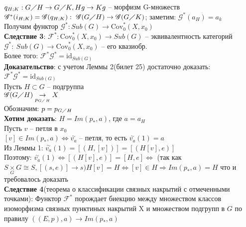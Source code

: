 	$q_{H;K}: G\diagup H \rightarrow G\diagup K, Hg \rightarrow Kg$ -- морфизм G-множеств\\
	$\mathscr{G}^* (i_{H;K}) = \mathscr{G}(q_{H;K}):\ \mathscr{G}(G\diagup H) \rightarrow \mathscr{G} (G\diagup K)$; заметим: $\mathscr{G}^* (a_H) = a_k$\\
	Получим функтор $\mathscr{G}^*: Sub(G)\rightarrow \text{Cov}_0^* (X,x_0)$\\
	\textbf{Следствие 3}: $\mathcal{F}^*: \text{Cov}_0^* (X,x_0) \rightarrow Sub(G)$ -- эквивалентность категорий\\
	$\mathscr{G}^*:\ Sub(G) \rightarrow \text{Cov}_0^* (X,x_0)$ -- его квазиобр.\\
	Более того: $\mathcal{F}^* \mathscr{G}^* =  \text{id}_{Sub(G)}$\\
	\textbf{Доказательство}: с учетом Леммы 2(билет 25) достаточно доказать: $\mathcal{F}^* \mathscr{G}^* =  \text{id}_{Sub(G)}$\\
	Пусть $H\subset G$ -- подгруппа\\
	$\mathscr{G} (G\diagup H) \underset{p_{G\diagup H}}{\rightarrow} X$\\
	Обозначим: $p = p_{G\diagup H}$\\
	\textbf{Хотим доказать}: $H = Im(p_{*},a)$, где $a = a_H$\\
	Пусть $v$ -- петля в $x_0$\\
	$[v] \in Im(p_{*},a) \Leftrightarrow \overset{\sim}{v_a}$ -- петля, то есть $\overset{\sim}{v_a} (1) = a$\\
	Из Леммы 1: $\overset{\sim}{v_a} (1) = [(H,[v])] = [(H[v],e)]$\\
	Поэтому: $\overset{\sim}{v_a} (1) \Leftrightarrow [(H[v],e)] = [H,e] \Leftrightarrow$ (так как $S \underset{G}{\times} G \cong S, [(s,e)]\rightarrow s) H[v] = H \Leftrightarrow [v]\in H \Rightarrow Im(p_{*},a) = H$ что и требовалось доказать\\
	\textbf{Следствие 4}(теорема о классификации связных накрытий с отмеченными точками): Функтор $\mathcal{F}^*$ порождает биекцию между множеством классов изоморфизма связных пунктиных накрытий X и множеством подгрупп в $G$ по правилу $((E,p),a) \rightarrow Im(p_{*},a)$\\
	\begin{figure}[h]
	\end{figure}\\


\newpage
